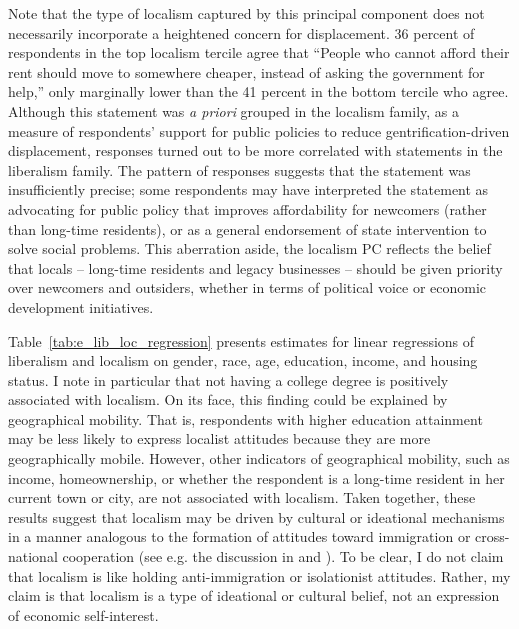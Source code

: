 \documentclass[article,11pt]{memoir}
\begin{document}
Note that the type of localism captured by this principal component does not necessarily incorporate a heightened concern for displacement.  36 percent of respondents in the top localism tercile agree that ``People who cannot afford their rent should move to somewhere cheaper, instead of asking the government for help,'' only marginally lower than the 41 percent in the bottom tercile who agree. Although this statement was \emph{a priori} grouped in the localism family, as a measure of respondents' support for public policies to reduce gentrification-driven displacement, responses turned out to be more correlated with statements in the liberalism family. The pattern of responses suggests that the statement was insufficiently precise; some respondents may have interpreted the statement as advocating for public policy that improves affordability for newcomers (rather than long-time residents), or as a general endorsement of state intervention to solve social problems. This aberration aside, the localism PC reflects the belief that locals -- long-time residents and legacy businesses -- should be given priority over newcomers and outsiders, whether in terms of political voice or economic development initiatives.  

Table~\ref{tab:e_lib_loc_regression} presents estimates for linear regressions of liberalism and localism on gender, race, age, education, income, and housing status. I note in particular that not having a college degree is positively associated with localism.  On its face, this finding could be explained by geographical mobility.  That is, respondents with higher education attainment may be less likely to express localist attitudes because they are more geographically mobile.  However, other indicators of geographical mobility, such as income, homeownership, or whether the respondent is a long-time resident in her current town or city, are not associated with localism. Taken together, these results suggest that localism may be driven by cultural or ideational mechanisms in a manner analogous to the formation of attitudes toward immigration or cross-national cooperation (see e.g. the discussion in \citealt{hainmueller_public_2014} and \citealt{bechtel_preferences_2014}). To be clear, I do not claim that localism is like holding anti-immigration or isolationist attitudes. Rather, my claim is that localism is a type of ideational or cultural belief, not an expression of economic self-interest.

\end{document}
